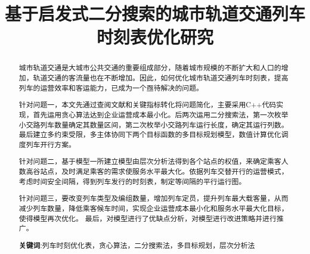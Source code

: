 \documentclass[UTF8]{ctexart}
\title{\textbf{基于启发式二分搜索的城市轨道交通列车时刻表优化研究}}%
\date{}%
\author{}%
\begin{document}
\setcounter{page}{1}%
\maketitle
\vspace{-0.95cm}
\thispagestyle{fancy}   
\fancyhf{} %
\renewcommand{\headrulewidth}{0pt} %
	\renewcommand{\abstractname}{\sihao 摘\quad 要} %
\begin{abstract}\xiaosihao
	\vspace{0.1cm}
	城市轨道交通是大城市公共交通的重要组成部分，随着城市规模的不断扩大和人口的增加，轨道交通的客流量也在不断增加。因此，如何优化城市轨道交通列车时刻表，提高列车的运营效率和客运能力，已成为一个亟待解决的问题。\par 
	针对问题一，本文先通过查阅文献和关键指标转化将问题简化，主要采用C++代码实现，首先运用贪心算法达到企业运营成本最小化。后两次运用二分搜索法，第一次枚举小交路列车数量确定其数量区间，第二次枚举小交路列车运行长度，确定其运行列数。最后建立多约束受限，多主体协同下两个目标函数的多目标规划模型，数值计算优化调度列车开行方案。\par 
	针对问题二，基于模型一所建立模型由层次分析法得到各个站点的权值，来确定乘客人数高谷站点，及时满足乘客的需求使服务水平最大化。依据列车交替开行的运营模式，考虑时间安全间隔，得到列车发行的时刻表，制定等间隔的平行运行图。\par 
	针对问题三，要改变列车类型及编组数量，增加列车定员，提升列车最大载客量，从而减少列车数量，降低乘客候车时间，实现企业运营成本最小化和服务水平最大化目标，使得模型再次优化。
	最后，对模型进行了优缺点分析，对模型进行改进策略并进行推广。\par 
	
	
	
	
	\textbf{关键词}:\quad 列车时刻优化表，贪心算法，二分搜索法，多目标规划，层次分析法
\end{abstract}

\newpage

\pagestyle{plain}
\end{document}
